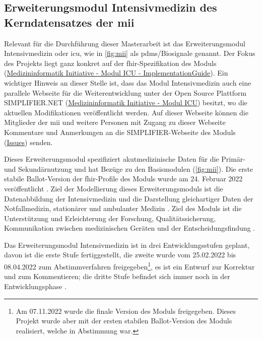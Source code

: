 \subsection{Erweiterungsmodul \glqq Intensivmedizin\grqq{} des Kerndatensatzes der \acs{mii}} \label{subsec:icumodul}

Relevant für die Durchführung dieser Masterarbeit ist das Erweiterungsmodul \glqq Intensivmedizin\grqq{} oder \ac{icu}, wie in \ref{fig:mii} als \acs{pdms}/Biosignale genannt. Der Fokus des Projekts liegt ganz konkret auf der \ac{fhir}-Spezifikation des Moduls (\href{https://www.medizininformatik-initiative.de/Kerndatensatz/Modul_Intensivmedizin/IGMIIKDSModulICU.html}{Medizininformatik Initiative - Modul ICU - ImplementationGuide}). Ein wichtiger Hinweis an dieser Stelle ist, dass das Modul \glqq Intensivmedizin\grqq{} auch eine parallele Webseite für die Weiterentwicklung unter der Open Source Plattform SIMPLIFIER.NET (\href{https://simplifier.net/medizininformatikinitiative-modul-intensivmedizin}{Medizininformatik Initiative - Modul ICU}) besitzt, wo die aktuellen Modifikationen veröffentlicht werden. Auf dieser Webseite können die Mitglieder der \ac{mii} und weitere Personen mit Zugang zu dieser Webseite Kommentare und Anmerkungen an die SIMPLIFIER-Webseite des Moduls (\href{https://simplifier.net/MedizininformatikInitiative-Modul-Intensivmedizin/~issues}{Issues}) senden.

Dieses Erweiterungsmodul spezifiziert akutmedizinische Daten für die Primär- und Sekundärnutzung und hat Bezüge zu den Basismodulen (\ref{fig:mii}). Die erste stabile Ballot-Version der \ac{fhir}-Profile des Moduls wurde am 24. Februar 2022 veröffentlicht \cite{modicu}. Ziel der Modellierung dieses Erweiterungsmoduls ist die Datenabbildung der Intensivmedizin und die Darstellung gleichartiger Daten der Notfallmedizin, stationärer und ambulanter Medizin \cite{icukdz}. Ziel des Moduls ist die Unterstützung und Erleichterung der Forschung, Qualitätssicherung, Kommunikation zwischen medizinischen Geräten und der Entscheidungsfindung \cite{modicuvid}.

Das Erweiterungsmodul \glqq Intensivmedizin\grqq{} ist in drei Entwicklungsstufen geplant, davon ist die erste Stufe fertiggestellt, die zweite wurde vom 25.02.2022 bis 08.04.2022 zum Abstimmverfahren freigegeben\footnote{Am 07.11.2022 wurde die finale Version des Moduls freigegeben. Dieses Projekt wurde aber mit der ersten stabilen Ballot-Version des Moduls realisiert, welche in Abstimmung war.}, es ist ein Entwurf zur Korrektur und zum Kommentieren; die dritte Stufe befindet sich immer noch in der Entwicklungsphase \cite{modicuvid}.

